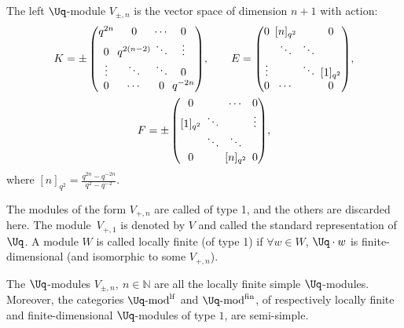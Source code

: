 \begin{Definition}
The left $\Uq$-module $V_{\pm,n}$ is the vector space of dimension $n+1$ with action:
\begin{gather*}
 K=\pm \setlength{\arraycolsep}{1.5pt}\begin{pmatrix}
 q^{2n} & 0& \cdots & 0 \\ 0& q^{2(n-2)} &\ddots &\vdots \\ \vdots &\ddots &\ddots&0 \\ 0 &\cdots&0& q^{-2n}\end{pmatrix}\!,\qquad
 E=\setlength{\arraycolsep}{2.5pt}\begin{pmatrix}
 0 & [n]_{q^2}& & 0 \\ & \ddots &\ddots & \\ \vdots & &\ddots&[1]_{q^2} \\ 0 & \cdots & & 0\end{pmatrix}\!,\\
 F=\setlength{\arraycolsep}{2.5pt}\pm \begin{pmatrix}
 0 & & \cdots & 0 \\ {[1]_{q^2}} & \ddots & & \vdots\\ & \ddots&\ddots& \\ 0 & & [n]_{q^2}& 0\end{pmatrix}\!,
 \end{gather*}
 where $ [n]_{q^2} = \frac{q^{2n}-q^{-2n}}{q^2-q^{-2}}$.

The modules of the form $V_{+,n}$ are called of type 1, and the others are discarded here. The mo\-du\-le~$V_{+,1}$ is denoted by $V$ and called the standard representation of $\Uq$.
A module $W$ is called locally finite (of type 1) if $\forall w \in W$, $\Uq \cdot w$ is finite-dimensional (and isomorphic to some $V_{+,n}$).
\end{Definition}

\begin{Proposition}
The $\Uq$-modules $V_{\pm,n},\ n \in \mathbb{N}$ are all the locally finite simple $\Uq$-modules. Moreover, the categories $\Uq\text{-}{\rm mod}^{\rm lf}$ and $\Uq\text{-}{\rm mod}^{\rm fin}$, of respectively locally finite and finite-dimensional $\Uq$-modules of type $1$, are semi-simple.
\end{Proposition}

